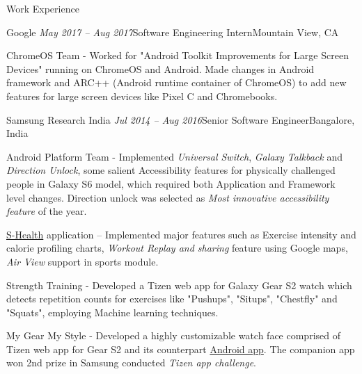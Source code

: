 \documentclass{resume} %
\begin{document}

\begin{rSection}{Work Experience}


\begin{rSubsection}{Google}{\emph{ May 2017 -- Aug 2017}}{Software Engineering Intern}{Mountain View, CA}
\item ChromeOS Team - Worked for "Android Toolkit Improvements for Large Screen Devices" running on ChromeOS and Android. Made changes in Android framework and ARC++ (Android runtime container of ChromeOS) to add new features for large screen devices like Pixel C and Chromebooks.
\end{rSubsection}


\begin{rSubsection}{Samsung Research India}{\emph{ Jul 2014 -- Aug 2016}}{Senior Software Engineer}{Bangalore, India}
\item Android Platform Team - Implemented {\emph{Universal Switch}}, {\emph{Galaxy Talkback}} and {\emph{Direction Unlock}}, some salient Accessibility features for physically challenged people in Galaxy S6 model, which required both Application and Framework level changes. Direction unlock was selected as {\emph{Most innovative accessibility feature}} of the year.
\item \href{https://play.google.com/store/apps/details?id=com.sec.android.app.shealth&hl=en}{S-Health} application -- Implemented major features such as Exercise intensity and calorie profiling charts, {\emph{Workout Replay and sharing}} feature using Google maps, {\emph{Air View}} support in sports module.
\item Strength Training - Developed a Tizen web app for Galaxy Gear S2 watch which detects repetition counts for exercises like "Pushups", "Situps", "Chestfly" and "Squats", employing Machine learning techniques.
\item My Gear My Style - Developed a highly customizable watch face comprised of Tizen web app for Gear S2 and its counterpart \href{https://play.google.com/store/apps/details?id=com.samsung.mygearmystyle&hl=en}{Android app}. The companion app won 2nd prize in Samsung conducted {\emph{Tizen app challenge}}.
\end{rSubsection}


\end{rSection}
\end{document}
